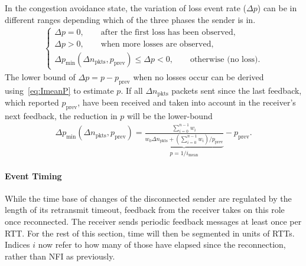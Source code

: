 \documentclass[twocolumn]{nictatechreport}
\begin{document}
In the congestion avoidance state, the variation of loss event rate ($\Delta p$) can be in different
ranges depending which of the three phases the sender is in.
\begin{gather}
  \begin{cases}
    \Delta p = 0, \qquad \text{after the first loss has been observed,} \\
    \Delta p > 0, \qquad \text{when more losses are observed,} \\
    \Delta p_\mathrm{min}(\Delta n_\mathrm{pkts},p_\mathrm{prev}) \le \Delta p < 0, \qquad \text{otherwise (no loss).}
  \end{cases}
  \label{eq:numerical-p-variation}
\end{gather} 
The lower bound of $\Delta p=p-p_\mathrm{prev}$ when no losses occur can be derived
using~\eqref{eq:ImeanP} to estimate $p$. If all
$\Delta n_\mathrm{pkts}$ packets sent since the last feedback, which reported
$p_\mathrm{prev}$, have been received and taken into account in the receiver's
next feedback, the reduction in $p$ will be the lower-bound
\begin{gather}
  \Delta p_\mathrm{min}(\Delta n_\mathrm{pkts},p_\mathrm{prev}) = 
  \underbrace{\frac{\sum_{i=0}^{n-1}w_i}{w_0\Delta n_\mathrm{pkts} +
  (\sum_{i=0}^{n-1}w_i)/p_\mathrm{prev}}}_{p=1/i_\mathrm{mean}}-p_\mathrm{prev}.
  \label{eq:numerical-delta-p}
\end{gather}

\paragraph{Event Timing}

While the time base of changes of the disconnected sender are regulated by the
length of its retransmit timeout, feedback from the receiver takes on this role
once reconnected. The receiver sends periodic feedback messages at least once
per RTT. For the rest of this section, time will then be segmented in units of
RTTs. Indices $i$ now refer to how many of those have elapsed since the
reconnection, rather than NFI as previously.
\end{document}
